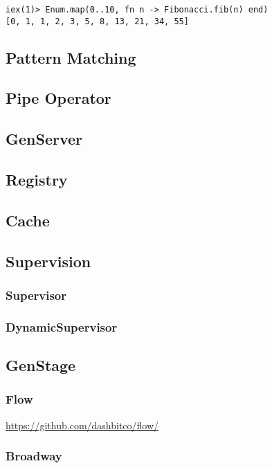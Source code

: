 {\inputminted[fontsize=\normalsize]{elixir}{../src/elixir/fibonacci.ex}

\begin{verbatim}
iex(1)> Enum.map(0..10, fn n -> Fibonacci.fib(n) end)
[0, 1, 1, 2, 3, 5, 8, 13, 21, 34, 55]
\end{verbatim}

\subsection{Pattern Matching}

\subsection{Pipe Operator}

\subsection{GenServer}

\subsection{Registry}

\subsection{Cache}

\subsection{Supervision}
\subsubsection{Supervisor}
\subsubsection{DynamicSupervisor}

\subsection{GenStage}
\subsubsection{Flow}

\url{https://github.com/dashbitco/flow/}

\subsubsection{Broadway}

}
